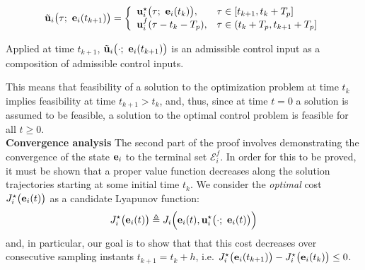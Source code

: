 \begin{equation}
  \tilde{\bm{\mathbf{u}}}_i\big(\tau;\ \bm{\mathbf{e}}_i(t_{k+1})\big) = \left\{ \\
      \begin{array}{ll}
        \bm{\mathbf{u}}_i^{\star}\big(\tau;\ \bm{\mathbf{e}}_i(t_k)\big), & \tau \in [t_{k+1}, t_k + T_p] \\
        \bm{\mathbf{u}}_i^f(\tau - t_k - T_p), & \tau \in (t_k + T_p, t_{k+1} + T_p]
      \end{array}
      \right.
\label{eq:optimal_input_t_plus_one}
\end{equation}

Applied at time $t_{k+1}$, $\tilde{\bm{\mathbf{u}}}_i\big(\cdot;\ \bm{\mathbf{e}}_i(t_{k+1})\big)$
is an admissible control input as a composition of admissible control inputs.

This means that feasibility of a solution to the optimization problem at time
$t_k$ implies feasibility at time $t_{k+1} > t_k$, and, thus, since at time $t=0$
a solution is assumed to be feasible, a solution to the optimal control problem
is feasible for all $t \geq 0$.\\

\textbf{Convergence analysis}
The second part of the proof involves demonstrating the convergence of the
state $\bm{\mathbf{e}}_i$ to the terminal set $\mathcal{E}_i^f$. In order for this
to be proved, it must be shown that a proper value function decreases along
the solution trajectories starting at some initial time $t_k$. We consider the
\textit{optimal} cost $J_i^{\star}\big(\bm{\mathbf{e}}_i(t)\big)$ as a candidate
Lyapunov function:
$$J_i^{\star}\big(\bm{\mathbf{e}}_i(t)\big) \triangleq J_i \Big(\bm{\mathbf{e}}_i(t), \bm{\mathbf{u}}_i^{\star}\big(\cdot;\ \bm{\mathbf{e}}_i(t)\big)\Big)$$
and, in particular, our goal is to show that that this cost decreases over
consecutive sampling instants $t_{k+1} = t_k + h$, i.e.
$J_i^{\star}\big(\bm{\mathbf{e}}_i(t_{k+1})\big) - J_i^{\star}\big(\bm{\mathbf{e}}_i(t_k)\big) \leq 0$.\\

